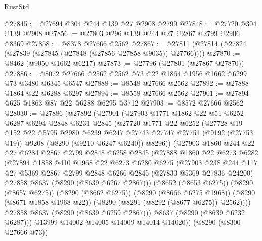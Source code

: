 \begin{lexlean}{RustStd}
\begin{coremodule}
@27845 := @27694 @304 @244 @139 @27 @2908 @2799
@27848 := @27720 @304 @139 @2908
@27856 := @27803 @296 @139 @244 @27 @2867 @2799 @2906 @8369
@27858 := @8378 @27666 @2562
@27867 := @27811 (@27814 (@27824 (@27839 (@27845 (@27848 (@27856 @27858 @9035)) @27766))))
@27870 := @8462 (@9050 @1662 @6217)
@27873 := @27796 (@27801 (@27867 @27870))
@27886 := @8072 @27666 @2562 @2562 @73 @22 @1864 @1956 @1662 @6299 @73 @3480 @6345 @6547
@27888 := @8548 @27666 @2562
@27892 := @27888 @1864 @22 @6288 @6297
@27894 := @8558 @27666 @2562
@27901 := @27894 @625 @1863 @87 @22 @6288 @6295 @3712
@27903 := @8572 @27666 @2562
@28030 := @27886
    (@27892
      (@27901
        (@27903
          @1771
          @1862
          @22
          @51
          @6252
          @6287
          @6294
          @2848
          @6231
          @2845
          (@27720
            @1771
            @22
            @6252
            (@27728
              @19
              @152
              @22
              @5795
              @2980
              @6239
              @6247
              @27743
              @27747
              @27751
              (@9192 (@27753 @19))
              @9208
              (@8290 (@9210 @6247 @6240))
              @8296))
          (@27903
            @1860
            @244
            @22
            @27
            @6284
            @2867
            @2799
            @2848
            @6258
            @2845
            (@27888
              @1860
              @22
              @6273
              @6282
              (@27894
                @1858
                @410
                @1968
                @22
                @6273
                @6280
                @6275
                (@27903
                  @238
                  @244
                  @117
                  @27
                  @5369
                  @2867
                  @2799
                  @2848
                  @6266
                  @2845
                  (@27833 @5369 @27836 @24200)
                  @27858
                  @8637
                  (@8290 (@8639 @6267 @2867)))
                (@8652 (@8653 @6275))
                (@8290 (@8657 @6275))
                (@8290 (@8662 @6275))
                (@8290 (@8666 @6275 @1968))
                (@8290 (@8671 @1858 @1968 @22))
                (@8290 (@8291 (@8292 (@8677 @6275)) @2562))))
            @27858
            @8637
            (@8290 (@8639 @6259 @2867)))
          @8637
          (@8290 (@8639 @6232 @6287)))
        @13999
        @14002
        @14005
        @14009
        @14014
        @14020))
    (@8290 (@8300 @27666 @73))

\end{coremodule}
\end{lexlean}
